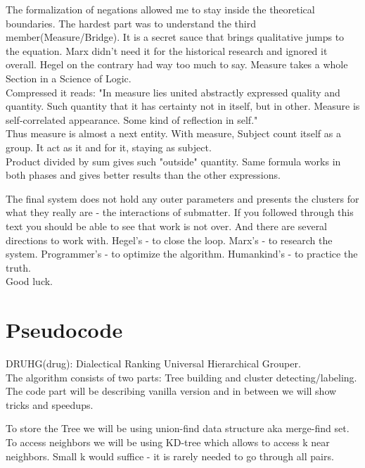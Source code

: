 \documentclass[12pt, a4paper, twocolumn]{article}
\begin{document}
\begin{appendices}
The formalization of negations allowed me to stay inside the theoretical boundaries. The hardest part was to understand the third member(Measure/Bridge). It is a secret sauce that brings qualitative jumps to the equation. Marx didn't need it for the historical research and ignored it overall. Hegel on the contrary had way too much to say. Measure takes a whole Section in a Science of Logic. 
\\ Compressed it reads: "In measure lies united abstractly expressed quality and quantity. Such quantity that it has certainty not in itself, but in other. Measure is self-correlated appearance. Some kind of reflection in self."
\\ Thus measure is almost a next entity. With measure, Subject count itself as a group. It act as it and for it, staying as subject.
\\ Product divided by sum gives such "outside" quantity. Same formula works in both phases and gives better results than the other expressions.

The final system does not hold any outer parameters and presents the clusters for what they really are - the interactions of submatter.
If you followed through this text you should be able to see that work is not over. And there are several directions to work with. Hegel's - to close the loop. Marx's - to research the system. Programmer's - to optimize the algorithm. Humankind's - to practice the truth.
\\ Good luck.

\newpage
\section{Pseudocode}\label{Pseudocode}

DRUHG(\foreignlanguage{russian}{drug}): Dialectical Ranking Universal Hierarchical Grouper.
\\ The algorithm consists of two parts: Tree building and cluster detecting/labeling.
\\ The code part will be describing vanilla version and in between we will show tricks and speedups.  

To store the Tree we will be using union-find data structure aka merge-find set.\cite{ArticleReference10}
\\ To access neighbors we will be using KD-tree\cite{ArticleReference11} which allows to access k near neighbors. Small k would suffice - it is rarely needed to go through all pairs.


\end{appendices}
\end{document}
